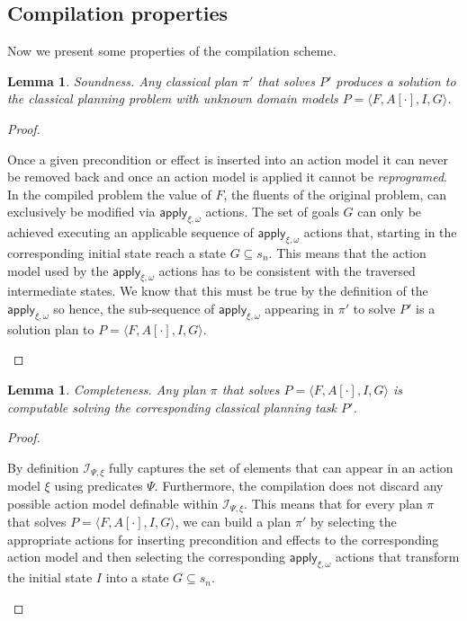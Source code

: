 \documentclass{article}
\newcommand{\tup}[1]{{\langle #1 \rangle}}
\newtheorem{mylemma}[mytheorem]{Lemma}
\begin{document}
\subsection{Compilation properties}
Now we present some properties of the compilation scheme.

\begin{mylemma}
Soundness. Any classical plan $\pi'$ that solves $P'$ produces a solution to the classical planning problem with unknown domain models $P=\tup{F,A[\cdot],I,G}$.
\end{mylemma}

\begin{proof}[Proof]
\begin{small}
Once a given precondition or effect is inserted into an action model it can never be removed back and once an action model is applied it cannot be {\em reprogramed}. In the compiled problem the value of $F$, the fluents of the original problem, can exclusively be modified via $\mathsf{apply_{\xi,\omega}}$ actions.  The set of goals $G$ can only be achieved executing an applicable sequence of $\mathsf{apply_{\xi,\omega}}$ actions that, starting in the corresponding initial state reach a state $G \subseteq s_n$. This means that the action model used by the $\mathsf{apply_{\xi,\omega}}$ actions has to be consistent with the traversed intermediate states. We know that this must be true by the definition of the $\mathsf{apply_{\xi,\omega}}$ so hence, the sub-sequence of $\mathsf{apply_{\xi,\omega}}$ appearing in $\pi'$ to solve $P'$ is a solution plan to $P=\tup{F,A[\cdot],I,G}$. 
\end{small}
\end{proof}

\begin{mylemma}
Completeness. Any plan $\pi$ that solves $P=\tup{F,A[\cdot],I,G}$ is computable solving the corresponding classical planning task $P'$.
\end{mylemma}

\begin{proof}[Proof]
\begin{small}
By definition ${\mathcal I}_{\Psi,\xi}$ fully captures the set of elements that can appear in an action model $\xi$ using predicates $\Psi$. Furthermore, the compilation does not discard any possible action model definable within ${\mathcal I}_{\Psi,\xi}$. This means that for every plan $\pi$ that solves $P=\tup{F,A[\cdot],I,G}$, we can build a plan $\pi'$ by selecting the appropriate actions for inserting precondition and effects to the corresponding action model and then selecting the corresponding $\mathsf{apply_{\xi,\omega}}$ actions that transform the initial state $I$ into a state $G \subseteq s_n$.
\end{small}
\end{proof}
\end{document}
